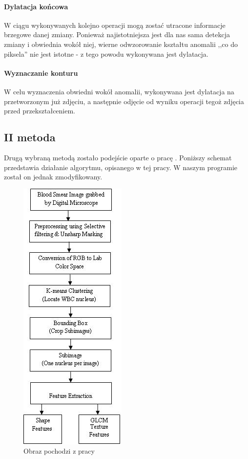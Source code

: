 \documentclass[11pt,openany]{sprawozdanie-agh}
\begin{document}
\paragraph{Dylatacja końcowa\\}
W ciągu wykonywanych kolejno operacji mogą zostać utracone informacje brzegowe danej zmiany. Ponieważ najistotniejsza jest dla nas sama detekcja zmiany i obwiednia wokół niej, wierne odwzorowanie kształtu anomalii ,,co do piksela'' nie jest istotne - z tego powodu wykonywana jest dylatacja.

\paragraph{Wyznaczanie konturu\\}
W celu wyznaczenia obwiedni wokół anomalii, wykonywana jest dylatacja na przetworzonym już zdjęciu, a następnie odjęcie od wyniku operacji tegoż zdjęcia przed przekształceniem.

\subsection{II metoda}
Drugą wybraną metodą zostało podejście oparte o pracę \cite{Mohapatra:2011:ALD:1947940.1947980}. Poniższy schemat przedstawia działanie algorytmu, opisanego w tej pracy. W naszym programie został on jednak zmodyfikowany.

\begin{figure}[h!]
	\centering
		\includegraphics[scale=0.6]{schemat_Automated_Leukemia_Detection_in_Blood_Microscopic}
	\caption{Obraz pochodzi z pracy \cite{Mohapatra:2011:ALD:1947940.1947980}}
\end{figure}
\end{document}
